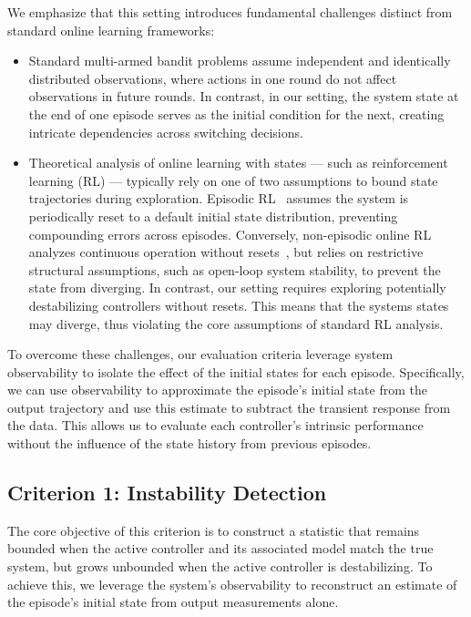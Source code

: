 \documentclass[11pt, twoside]{article}
\newcounter{criteria}
\theoremstyle{definition}
\begin{document}
We emphasize that this setting introduces fundamental challenges distinct from standard online learning frameworks:
\begin{itemize}[wide, labelindent=3pt]
    \item Standard multi-armed bandit problems assume independent and identically distributed observations, where actions in one round do not affect observations in future rounds.
    In contrast, in our setting, the system state at the end of one episode serves as the initial condition for the next, creating intricate dependencies across switching decisions.
    \item Theoretical analysis of online learning with states --- such as reinforcement learning (RL) --- typically rely on one of two assumptions to bound state trajectories during exploration.
    Episodic RL~\cite{jin2018q} assumes the system is periodically reset to a default initial state distribution, preventing compounding errors across episodes.
    Conversely, non-episodic online RL analyzes continuous operation without resets~\cite{simchowitz2020naive,muehlebach2026the,tian2023can}, but relies on restrictive structural assumptions, such as open-loop system stability, to prevent the state from diverging.
    In contrast, our setting requires exploring potentially destabilizing controllers without resets.
    This means that the systems states may diverge, thus violating the core assumptions of standard RL analysis.
\end{itemize}

To overcome these challenges, our evaluation criteria leverage system observability to isolate the effect of the initial states for each episode.
Specifically, we can use observability to approximate the episode's initial state from the output trajectory and use this estimate to subtract the transient response from the data.
This allows us to evaluate each controller's intrinsic performance without the influence of the state history from previous episodes.


\subsection{Criterion 1: Instability Detection}
\label{sec:instability}
The core objective of this criterion is to construct a statistic that remains bounded when the active controller and its associated model match the true system, but grows unbounded when the active controller is destabilizing.
To achieve this, we leverage the system's observability to reconstruct an estimate of the episode's initial state from output measurements alone.
\end{document}
